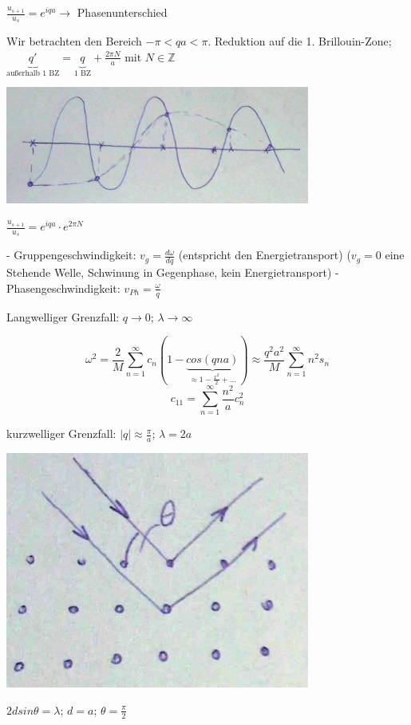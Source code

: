 \(\frac{u_{s+1}}{u_s} = e^{iqa}\rightarrow\) Phasenunterschied

Wir betrachten den Bereich \(-\pi < qa < \pi\). Reduktion auf die 1. Brillouin-Zone; \(\underbrace{q'}_{\text{außerhalb 1 BZ}}=\underbrace{q}_{\text{1 BZ}}+\frac{2\pi N}{a}\) mit \(N\in \mathbb Z\)

\includegraphics[width=0.75\textwidth]{kap06_03.png}

\(\frac{u_{s+1}}{u_s} = e^{iqa}\cdot e^{2\pi N}\)

- Gruppengeschwindigkeit: \(v_g = \frac{d\omega}{dq}\) (entspricht den Energietransport) (\(v_g=0\) eine Stehende Welle, Schwinung in Gegenphase, kein Energietransport)
- Phasengeschwindigkeit: \(v_{Ph} = \frac{\omega}{q}\)

Langwelliger Grenzfall: \(q\rightarrow 0\); \(\lambda \rightarrow \infty\)

\[\omega^2 = \frac{2}{M} \sum^{\infty}_{n=1}c_n(1-\underbrace{cos(qna)}_{\approx 1-\frac{x^2}{2}+...})\approx \frac{q^2a^2}{M}\sum^{\infty}_{n=1}n^2s_n\]
\[ c_{11} = \sum^{\infty}_{n=1} \frac{n^2}{a}c^2_n\]

kurzwelliger Grenzfall: \(|q|\approx \frac{\pi}{a}\); \(\lambda = 2a\)

 \includegraphics[width=0.75\textwidth]{kap06_04.png}

\(2dsin\theta=\lambda\); \(d=a\); \(\theta = \frac{\pi}{2}\)

